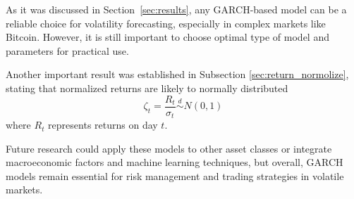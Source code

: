 As it was discussed in Section~\ref{sec:results}, any GARCH-based model can be a reliable choice for volatility forecasting, especially in complex markets like Bitcoin. However, it is still important to choose optimal type of model and parameters for practical use.

Another important result was established in Subsection \ref{sec:return_normolize}, stating that normalized returns are likely to normally distributed \[\zeta_t = \frac{R_t}{\sigma_t} \stackrel{d}{\sim} N(0, 1)\]
where \(R_t\) represents returns on day \(t\).

Future research could apply these models to other asset classes or integrate macroeconomic factors and machine learning techniques, but overall, GARCH models remain essential for risk management and trading strategies in volatile markets.





